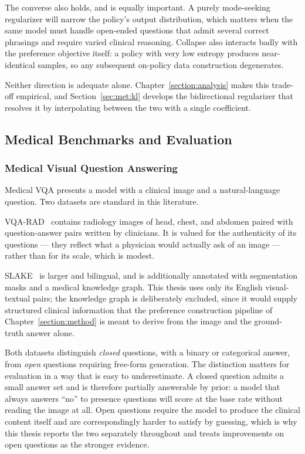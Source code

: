 The converse also holds, and is equally important. A purely mode-seeking regularizer will narrow the policy's output distribution, which matters when the same model must handle open-ended questions that admit several correct phrasings and require varied clinical reasoning. Collapse also interacts badly with the preference objective itself: a policy with very low entropy produces near-identical samples, so any subsequent on-policy data construction degenerates.

Neither direction is adequate alone. Chapter~\ref{section:analysis} makes this trade-off empirical, and Section~\ref{sec:met:kl} develops the bidirectional regularizer that resolves it by interpolating between the two with a single coefficient.

\subsection{Medical Benchmarks and Evaluation}
\label{sec:bg:benchmarks}

\subsubsection{Medical Visual Question Answering}

Medical VQA presents a model with a clinical image and a natural-language question. Two datasets are standard in this literature.

VQA-RAD~\cite{lau2018dataset} contains radiology images of head, chest, and abdomen paired with question-answer pairs written by clinicians. It is valued for the authenticity of its questions --- they reflect what a physician would actually ask of an image --- rather than for its scale, which is modest.

SLAKE~\cite{liu2021slake} is larger and bilingual, and is additionally annotated with segmentation masks and a medical knowledge graph. This thesis uses only its English visual-textual pairs; the knowledge graph is deliberately excluded, since it would supply structured clinical information that the preference construction pipeline of Chapter~\ref{section:method} is meant to derive from the image and the ground-truth answer alone.

Both datasets distinguish \emph{closed} questions, with a binary or categorical answer, from \emph{open} questions requiring free-form generation. The distinction matters for evaluation in a way that is easy to underestimate. A closed question admits a small answer set and is therefore partially answerable by prior: a model that always answers ``no'' to presence questions will score at the base rate without reading the image at all. Open questions require the model to produce the clinical content itself and are correspondingly harder to satisfy by guessing, which is why this thesis reports the two separately throughout and treats improvements on open questions as the stronger evidence.

